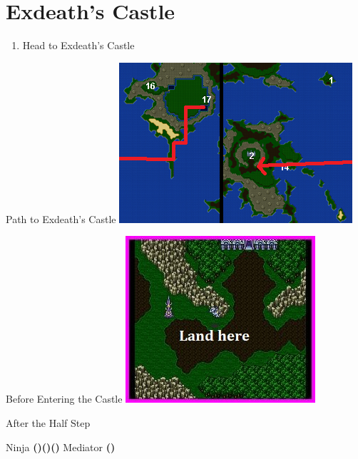 \chapter{Exdeath's Castle}

\vspace{\baselineskip}

\begin{paracol}{2}

\begin{enumerate}
    \item Head to Exdeath's Castle
\end{enumerate}

\switchcolumn
\begin{misc}{Path to Exdeath's Castle}
    \includegraphics[scale=0.7]{../Graphics/Maps/12. To Exdeath's Castle.png}
\end{misc}

\switchcolumnTwice[*]
\begin{steproute}{Before Entering the Castle}
    \includegraphics[scale=0.452]{../Graphics/Steps/158. Exdeath's Castle 1.jpg}
\end{steproute}

\switchcolumn
\begin{menu}{After the Half Step}
    \varwb
    \begin{jobMenu}
        \cara Ninja \textbf{(\pointLeft)(\pointDown)(\pointLeft)} \ability{\dash}
        \faris Mediator \textbf{(\pointUp)}       
    \end{jobMenu}
    \varwe
\end{menu}


\end{paracol}
